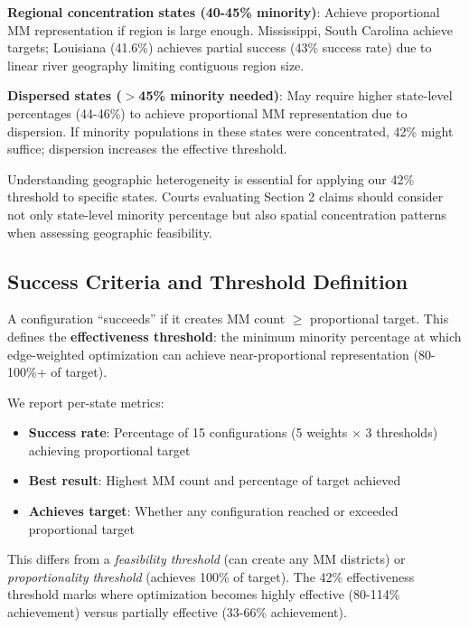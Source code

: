 \textbf{Regional concentration states (40-45\% minority)}: Achieve proportional MM representation if region is large enough. Mississippi, South Carolina achieve targets; Louisiana (41.6\%) achieves partial success (43\% success rate) due to linear river geography limiting contiguous region size.

\textbf{Dispersed states ($>$45\% minority needed)}: May require higher state-level percentages (44-46\%) to achieve proportional MM representation due to dispersion. If minority populations in these states were concentrated, 42\% might suffice; dispersion increases the effective threshold.

Understanding geographic heterogeneity is essential for applying our 42\% threshold to specific states. Courts evaluating Section 2 claims should consider not only state-level minority percentage but also spatial concentration patterns when assessing geographic feasibility.

\subsection{Success Criteria and Threshold Definition}

A configuration ``succeeds'' if it creates MM count $\geq$ proportional target. This defines the \textbf{effectiveness threshold}: the minimum minority percentage at which edge-weighted optimization can achieve near-proportional representation (80-100\%+ of target).

We report per-state metrics:
\begin{itemize}
    \item \textbf{Success rate}: Percentage of 15 configurations (5 weights $\times$ 3 thresholds) achieving proportional target
    \item \textbf{Best result}: Highest MM count and percentage of target achieved
    \item \textbf{Achieves target}: Whether any configuration reached or exceeded proportional target
\end{itemize}

This differs from a \textit{feasibility threshold} (can create any MM districts) or \textit{proportionality threshold} (achieves 100\% of target). The 42\% effectiveness threshold marks where optimization becomes highly effective (80-114\% achievement) versus partially effective (33-66\% achievement).
